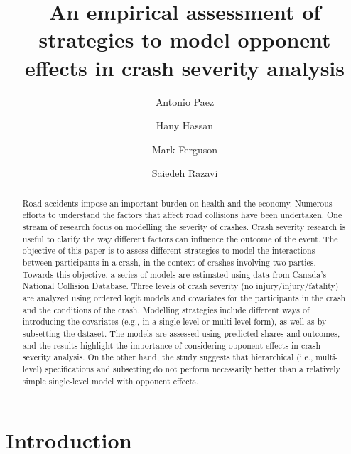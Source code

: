 \documentclass[]{elsarticle} %
\begin{document}
\begin{frontmatter}

  \title{An empirical assessment of strategies to model opponent effects in crash
severity analysis}
    \author[]{Antonio Paez}
    \author[Louisiana State University]{Hany Hassan}
    \author[McMaster University]{Mark Ferguson}
    \author[McMaster University]{Saiedeh Razavi}
      \address[McMaster University]{McMaster Institute for Transportation and Logistics, 1280 Main Street
West, Hamilton, Ontario, Canada L8S 4K1}
    \address[Louisiana State University]{Department of Civil and Environmental Engineering, Baton Rouge,
Louisiana, USA 70803}
    
  \begin{abstract}
  Road accidents impose an important burden on health and the economy.
  Numerous efforts to understand the factors that affect road collisions
  have been undertaken. One stream of research focus on modelling the
  severity of crashes. Crash severity research is useful to clarify the
  way different factors can influence the outcome of the event. The
  objective of this paper is to assess different strategies to model the
  interactions between participants in a crash, in the context of crashes
  involving two parties. Towards this objective, a series of models are
  estimated using data from Canada's National Collision Database. Three
  levels of crash severity (no injury/injury/fatality) are analyzed using
  ordered logit models and covariates for the participants in the crash
  and the conditions of the crash. Modelling strategies include different
  ways of introducing the covariates (e.g., in a single-level or
  multi-level form), as well as by subsetting the dataset. The models are
  assessed using predicted shares and outcomes, and the results highlight
  the importance of considering opponent effects in crash severity
  analysis. On the other hand, the study suggests that hierarchical (i.e.,
  multi-level) specifications and subsetting do not perform necessarily
  better than a relatively simple single-level model with opponent
  effects.
  \end{abstract}
  
 \end{frontmatter}

\hypertarget{introduction}{%
\section{Introduction}\label{introduction}}
\end{document}
